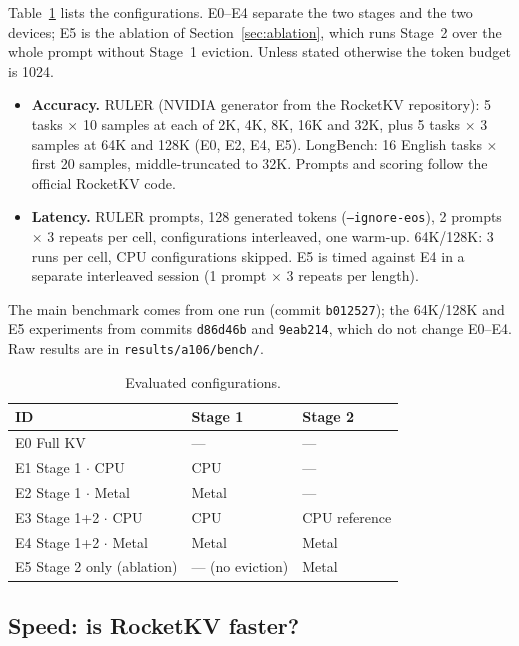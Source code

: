 \documentclass[10pt,letterpaper]{article}
\newcommand{\code}[1]{\texttt{#1}}
\begin{document}
Table~\ref{tab:configs} lists the configurations. E0--E4 separate the two stages and the two devices; E5 is the ablation of Section~\ref{sec:ablation}, which runs Stage~2 over the whole prompt without Stage~1 eviction. Unless stated otherwise the token budget is 1024.
\begin{itemize}
\item \textbf{Accuracy.} RULER (NVIDIA generator from the RocketKV repository): 5 tasks $\times$ 10 samples at each of 2K, 4K, 8K, 16K and 32K, plus 5 tasks $\times$ 3 samples at 64K and 128K (E0, E2, E4, E5). LongBench: 16 English tasks $\times$ first 20 samples, middle-truncated to 32K. Prompts and scoring follow the official RocketKV code.
\item \textbf{Latency.} RULER prompts, 128 generated tokens (\code{--ignore-eos}), 2 prompts $\times$ 3 repeats per cell, configurations interleaved, one warm-up. 64K/128K: 3 runs per cell, CPU configurations skipped. E5 is timed against E4 in a separate interleaved session (1 prompt $\times$ 3 repeats per length).
\end{itemize}
The main benchmark comes from one run (commit \code{b012527}); the 64K/128K and E5 experiments from commits \code{d86d46b} and \code{9eab214}, which do not change E0--E4. Raw results are in \code{results/a106/bench/}.

\begin{table}[h]
\centering\small
\caption{Evaluated configurations.}
\label{tab:configs}
\begin{tabular}{lll}
\toprule
ID & Stage 1 & Stage 2 \\
\midrule
E0 Full KV & --- & --- \\
E1 Stage 1 $\cdot$ CPU & CPU & --- \\
E2 Stage 1 $\cdot$ Metal & Metal & --- \\
E3 Stage 1+2 $\cdot$ CPU & CPU & CPU reference \\
E4 Stage 1+2 $\cdot$ Metal & Metal & Metal \\
E5 Stage 2 only (ablation) & --- (no eviction) & Metal \\
\bottomrule
\end{tabular}
\end{table}

\subsection{Speed: is RocketKV faster?}
\label{sec:speed}
\end{document}
